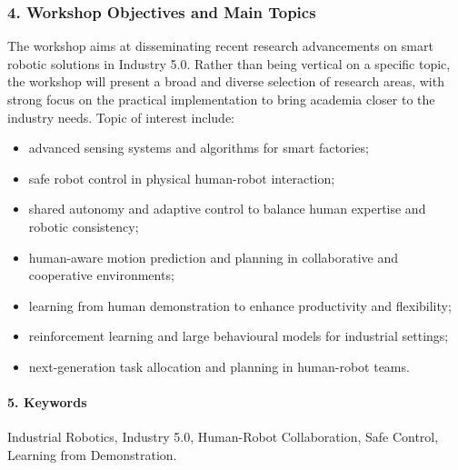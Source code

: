 \documentclass{article}
\begin{document}
\subsubsection*{4. Workshop Objectives and Main Topics}
The workshop aims at disseminating recent research advancements on smart robotic solutions in Industry 5.0. Rather than being vertical on a specific topic, the workshop will present a broad and diverse selection of research areas, with strong focus on the practical implementation to bring academia closer to the industry needs. 
Topic of interest include:
\begin{itemize}
    \item advanced sensing systems and algorithms for smart factories;
    \item safe robot control in physical human-robot interaction;
    \item shared autonomy and adaptive control to balance human expertise and robotic consistency;
    \item human-aware motion prediction and planning in collaborative and cooperative environments;
    \item learning from human demonstration to enhance productivity and flexibility;
    \item reinforcement learning and large behavioural models for industrial settings;
    \item next-generation task allocation and planning in human-robot teams.
\end{itemize}


\paragraph{5. Keywords} 
Industrial Robotics, Industry 5.0, Human-Robot Collaboration, Safe Control, Learning from Demonstration.
\end{document}
